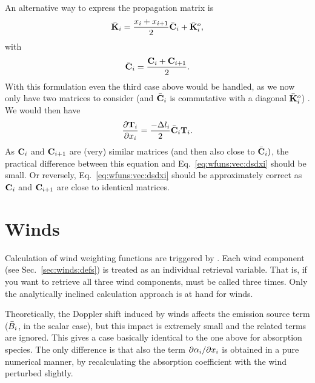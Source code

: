 An alternative way to express the propagation matrix is
\begin{displaymath}
  \bar{{\bf K}}_i = \frac{x_{i}+x_{i+1}}{2}\bar{\mathbf{C}}_i + 
   \bar{{\bf K}}_i^o,   
\end{displaymath}
with
\begin{displaymath}
  \bar{\mathbf{C}}_i = \frac{\mathbf{C}_i+\mathbf{C}_{i+1}}{2}.   
\end{displaymath}
With this formulation even the third case above would be handled, as we now
only have two matrices to consider (and $\bar{\mathbf{C}}_i$ is commutative
with a diagonal $\bar{{\bf K}}_i^o$) . We would then have
\begin{displaymath}
  \frac{\partial\mathbf{T}_{i}}{\partial x_{i}} =  
  \frac{-\Delta l_{i}}{2} \bar{\mathbf{C}}_i \mathbf{T}_{i}.    
\end{displaymath}
As $\mathbf{C}_i$ and $\mathbf{C}_{i+1}$ are (very) similar matrices (and then
also close to $\bar{\mathbf{C}}_i)$, the practical difference between this
equation and Eq.~\ref{eq:wfuns:vec:dsdxi} should be small. Or reversely,
Eq.~\ref{eq:wfuns:vec:dsdxi} should be approximately correct as $\mathbf{C}_i$
and $\mathbf{C}_{i+1}$ are close to identical matrices.



\section{Winds}
\label{sec:wfuns:winds}
%
Calculation of wind weighting functions are triggered by
. Each wind component (see Sec.~\ref{sec:winds:defs})
is treated as an individual retrieval variable. That is, if you want to
retrieve all three wind components,  must be called
three times. Only the analytically inclined calculation approach is at hand
for winds.

Theoretically, the Doppler shift induced by winds affects the emission source
term ($\bar{B}_i$, in the scalar case), but this impact is extremely small
and the related terms are ignored. This gives a case basically identical to the
one above for absorption species. The only difference is that also the term
$\partial{\alpha}_{i}/\partial x_{i}$ is obtained in a pure numerical manner,
by recalculating the absorption coefficient with the wind perturbed slightly.





